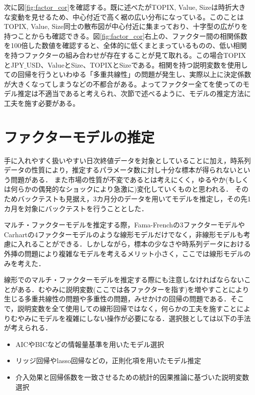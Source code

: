 \documentclass[11pt]{jreport}
\begin{document}
次に図\ref{fig:factor_cor}を確認する。既に述べたがTOPIX, Value, Sizeは時折大きな変動を見せるため、中心付近で高く裾の広い分布になっている。このことはTOPIX, Value, Size同士の散布図が中心付近に集まっており、十字型の広がりを持つことからも確認できる。図\ref{fig:factor_cor}右上の、ファクター間の相関係数を100倍した数値を確認すると、全体的に低くまとまっているものの、低い相関を持つファクターの組み合わせが存在することが見て取れる。この場合TOPIXとJPY$\_$USD、ValueとSize、TOPIXとSizeである。相関を持つ説明変数を使用しての回帰を行うといわゆる「多重共線性」の問題が発生し、実際以上に決定係数が大きくなってしまうなどの不都合がある。よってファクター全てを使ってのモデル推定は不適当であると考えられ、次節で述べるように、モデルの推定方法に工夫を施す必要がある。

\section{ファクターモデルの推定}
手に入れやすく扱いやすい日次終値データを対象としていることに加え，時系列データの性質により，推定するパラメータ数に対し十分な標本が得られないという問題がある．
また市場の性質が不変であるとは考えにくく，ゆるやか(もしくは何らかの偶発的なショックにより急激に)変化していくものと思われる．
そのためバックテストも見据え，3カ月分のデータを用いてモデルを推定し，その先1カ月を対象にバックテストを行うこととした．

マルチ・ファクターモデルを推定する際，Fama-Frenchの3ファクターモデルやCarhartの4ファクターモデルのような線形モデルだけでなく，非線形モデルも考慮に入れることができる．しかしながら，標本の少なさや時系列データにおける外挿の問題により複雑なモデルを考えるメリット小さく，ここでは線形モデルのみを考えた．

線形でのマルチ・ファクターモデルを推定する際にも注意しなければならないことがある．むやみに説明変数(ここでは各ファクターを指す)を増やすことにより生じる多重共線性の問題や多重性の問題，みせかけの回帰の問題である．そこで，説明変数を全て使用しての線形回帰ではなく，何らかの工夫を施すことによりむやみにモデルを複雑にしない操作が必要になる．選択肢としては以下の手法が考えられる．

\begin{itemize}
\item AICやBICなどの情報量基準を用いたモデル選択
\item リッジ回帰やlasso回帰などの，正則化項を用いたモデル推定
\item 介入効果と回帰係数を一致させるための統計的因果推論に基づいた説明変数選択
\end{itemize}
\end{document}

